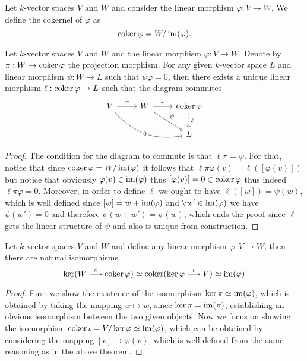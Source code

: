 \begin{definition}[Cokernel]
Let \(k\)-vector spaces \(V\) and \(W\) and consider the linear morphism
\(\varphi : V \to W\). We define the cokernel of \(\varphi\) as
\[
  \operatorname{coker} \varphi = W/\operatorname{im}(\varphi).
\]
\end{definition}

\begin{theorem}
  Let \(k\)-vector spaces \(V\) and \(W\) and the linear morphism \(\varphi : V
  \to W\). Denote by \(\pi : W \to \operatorname{coker} \varphi\) the projection morphism.
  For any given \(k\)-vector space \(L\) and linear morphism \(\psi : W \to L\)
  such that  \(\psi  \varphi = 0\), then there exists a unique linear
  morphism  \(\ell : \operatorname{coker} \varphi \to L\) such that the diagram commutes
  \[
    \begin{tikzcd}
      V \ar[drr, bend right, "0" description] \ar[r, "\varphi"] &W \ar[r,
      "\pi"] \ar[dr, "\psi"] &\coker \varphi \ar[d, dashed, "\ell"]
      \\
      & &L
    \end{tikzcd}
  \]
\end{theorem}

\begin{proof}
The condition for the diagram to commute is that \(\ell  \pi = \psi\).
For that, notice that since \(\operatorname{coker} \varphi = W/\operatorname{im}(\varphi)\) it follows
that \(\ell  \pi  \varphi (v) = \ell([\varphi(v)])\) but notice that
obviously \(\varphi(v) \in \operatorname{im}(\varphi)\) thus \([\varphi(v)] = 0 \in \operatorname{coker}
\varphi\) thus indeed \(\ell  \pi  \varphi = 0\). Moreover, in order
to define \(\ell\) we ought to have \(\ell([w]) = \psi(w)\), which is well
defined since \([w] = w + \operatorname{im}(\varphi)\) and \(\forall w' \in \operatorname{im}(\varphi)\)
we have \(\psi(w') = 0\) and therefore \(\psi(w + w') = \psi(w)\), which ends
the proof since \(\ell\) gets the linear structure of \(\psi\) and also is
unique from construction.
\end{proof}

\begin{proposition}
Let \(k\)-vector spaces \(V\) and \(W\) and define any linear morphism
\(\varphi : V \to W\), then there are natural isomorphisms
\[
  \ker(W \overset \pi \longrightarrow \operatorname{coker} \varphi) \simeq \operatorname{coker}(\ker \varphi
  \overset \iota \longrightarrow V) \simeq \operatorname{im}(\varphi)
\]
\end{proposition}

\begin{proof}
First we show the existence of the isomorphism \(\ker \pi \simeq \operatorname{im}(\varphi)\),
which is obtained by taking the mapping \(w \mapsto w\), since \(\ker \pi =
\operatorname{im}(\pi)\), establishing an obvious isomorphism between the two given objects.
Now we focus on showing the isomorphism \(\operatorname{coker} \iota = V/\ker \varphi \simeq
\operatorname{im}(\varphi)\), which can be obtained by considering the mapping \([v] \mapsto
\varphi(v)\), which is well defined from the same reasoning as in the above
theorem.
\end{proof}

